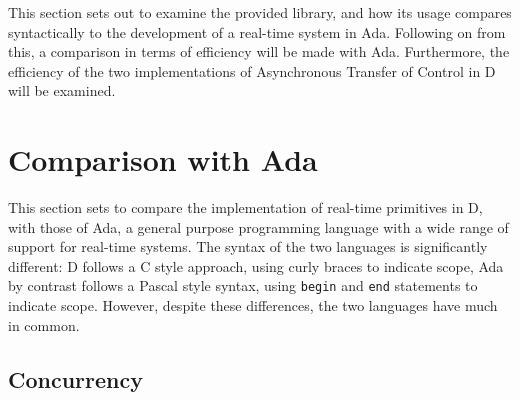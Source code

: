 
This section sets out to examine the provided library, and how its usage
compares syntactically to the development of a real-time system in Ada. 
Following on from
this, a comparison in terms of efficiency will be made with Ada. Furthermore,
the efficiency of the two implementations of Asynchronous Transfer of Control in 
D will be examined. 

\section{Comparison with Ada}

This section sets to compare the implementation of real-time primitives in D,
with those of Ada, a general purpose programming language with a wide range of
support for real-time systems. The syntax of the two languages is significantly 
different: D follows a C style approach, using curly braces to indicate scope,
Ada by contrast follows a Pascal style syntax, using \texttt{begin} and
\texttt{end} statements to indicate scope. However, despite these differences,
the two languages have much in common. 

\subsection{Concurrency}

